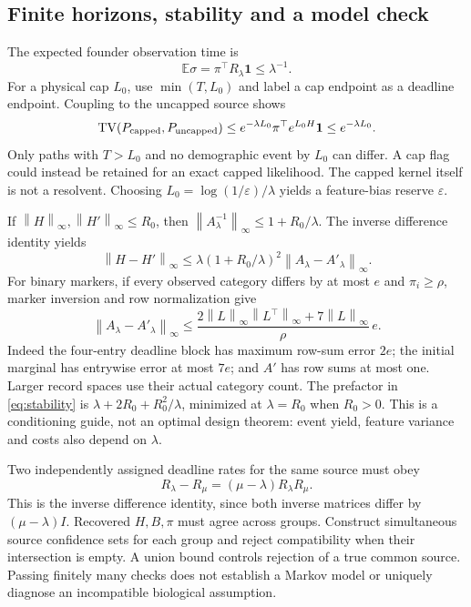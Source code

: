 \documentclass[11pt]{article}
\theoremstyle{definition}
\newcommand{\one}{\mathbf 1}
\newcommand{\TV}{\operatorname{TV}}
\newcommand{\E}{\mathbb E}
\newcommand{\norm}[1]{\left\lVert#1\right\rVert_\infty}
\begin{document}
\subsection{Finite horizons, stability and a model check}
The expected founder observation time is
\begin{equation}\label{eq:time}
 \E\sigma=\pi^\top R_\lambda\one\le\lambda^{-1}.
\end{equation}
For a physical cap $L_0$, use $\min(T,L_0)$ and label a cap endpoint as a
deadline endpoint. Coupling to the uncapped source shows
\begin{equation}\label{eq:cap}
 \TV(P_{\rm capped},P_{\rm uncapped})
 \le e^{-\lambda L_0}\pi^\top e^{L_0H}\one\le e^{-\lambda L_0}.
\end{equation}
Only paths with $T>L_0$ and no demographic event by $L_0$ can differ. A cap flag
could instead be retained for an exact capped likelihood. The capped kernel
itself is not a resolvent. Choosing $L_0=\log(1/\varepsilon)/\lambda$ yields a
feature-bias reserve $\varepsilon$.

If $\norm{H},\norm{H'}\le R_0$, then $\norm{A_\lambda^{-1}}\le1+R_0/\lambda$.
The inverse difference identity yields
\begin{equation}\label{eq:stability}
 \norm{H-H'}\le\lambda(1+R_0/\lambda)^2\norm{A_\lambda-A'_\lambda}.
\end{equation}
For binary markers, if every observed category differs by at most $e$ and
$\pi_i\ge\rho$, marker inversion and row normalization give
\[
 \norm{A_\lambda-A'_\lambda}
 \le \frac{2\norm{L}\norm{L^\top}+7\norm{L}}{\rho}\,e.
\]
Indeed the four-entry deadline block has maximum row-sum error $2e$; the initial
marginal has entrywise error at most $7e$; and $A'$ has row sums at most one.
Larger record spaces use their actual category count. The prefactor in
\eqref{eq:stability} is $\lambda+2R_0+R_0^2/\lambda$, minimized at
$\lambda=R_0$ when $R_0>0$. This is a conditioning guide, not an optimal design
theorem: event yield, feature variance and costs also depend on $\lambda$.

Two independently assigned deadline rates for the same source must obey
\begin{equation}\label{eq:identity}
 R_\lambda-R_\mu=(\mu-\lambda)R_\lambda R_\mu.
\end{equation}
This is the inverse difference identity, since both inverse matrices differ by
$(\mu-\lambda)I$. Recovered $H,B,\pi$ must agree across groups. Construct
simultaneous source confidence sets for each group and reject compatibility when
their intersection is empty. A union bound controls rejection of a true common
source. Passing finitely many checks does not establish a Markov model or
uniquely diagnose an incompatible biological assumption.
\end{document}
